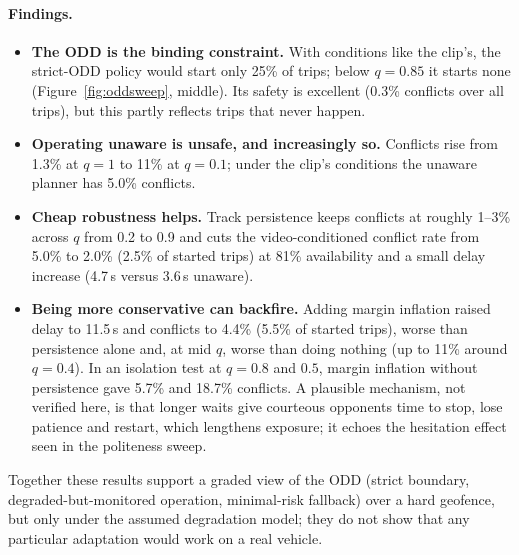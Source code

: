 \paragraph{Findings.}
\begin{itemize}\setlength\itemsep{1pt}
\item \textbf{The ODD is the binding constraint.} With conditions like the clip's, the strict-ODD policy would start only 25\% of trips; below $q=0.85$ it starts none (Figure~\ref{fig:oddsweep}, middle). Its safety is excellent (0.3\% conflicts over all trips), but this partly reflects trips that never happen.
\item \textbf{Operating unaware is unsafe, and increasingly so.} Conflicts rise from 1.3\% at $q=1$ to 11\% at $q=0.1$; under the clip's conditions the unaware planner has 5.0\% conflicts.
\item \textbf{Cheap robustness helps.} Track persistence keeps conflicts at roughly 1--3\% across $q$ from 0.2 to 0.9 and cuts the video-conditioned conflict rate from 5.0\% to 2.0\% (2.5\% of started trips) at 81\% availability and a small delay increase (4.7\,s versus 3.6\,s unaware).
\item \textbf{Being more conservative can backfire.} Adding margin inflation raised delay to 11.5\,s and conflicts to 4.4\% (5.5\% of started trips), worse than persistence alone and, at mid $q$, worse than doing nothing (up to 11\% around $q=0.4$). In an isolation test at $q=0.8$ and $0.5$, margin inflation without persistence gave 5.7\% and 18.7\% conflicts. A plausible mechanism, not verified here, is that longer waits give courteous opponents time to stop, lose patience and restart, which lengthens exposure; it echoes the hesitation effect seen in the politeness sweep.
\end{itemize}
Together these results support a graded view of the ODD (strict boundary, degraded-but-monitored operation, minimal-risk fallback) over a hard geofence, but only under the assumed degradation model; they do not show that any particular adaptation would work on a real vehicle.
